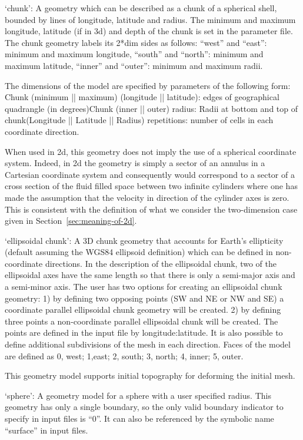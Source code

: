\begin{itemize}
`chunk': A geometry which can be described as a chunk of a spherical shell, bounded by lines of longitude, latitude and radius. The minimum and maximum longitude, latitude (if in 3d) and depth of the chunk is set in the parameter file. The chunk geometry labels its 2*dim sides as follows: ``west'' and ``east'': minimum and maximum longitude, ``south'' and ``north'': minimum and maximum latitude, ``inner'' and ``outer'': minimum and maximum radii. 

The dimensions of the model are specified by parameters of the following form: Chunk (minimum || maximum) (longitude || latitude): edges of geographical quadrangle (in degrees)Chunk (inner || outer) radius: Radii at bottom and top of chunk(Longitude || Latitude || Radius) repetitions: number of cells in each coordinate direction.

When used in 2d, this geometry does not imply the use of a spherical coordinate system. Indeed, in 2d the geometry is simply a sector of an annulus in a Cartesian coordinate system and consequently would correspond to a sector of a cross section of the fluid filled space between two infinite cylinders where one has made the assumption that the velocity in direction of the cylinder axes is zero. This is consistent with the definition of what we consider the two-dimension case given in Section~\ref{sec:meaning-of-2d}.

`ellipsoidal chunk': A 3D chunk geometry that accounts for Earth's ellipticity (default assuming the WGS84 ellipsoid definition) which can be defined in non-coordinate directions. In the description of the ellipsoidal chunk, two of the ellipsoidal axes have the same length so that there is only a semi-major axis and a semi-minor axis. The user has two options for creating an ellipsoidal chunk geometry: 1) by defining two opposing points (SW and NE or NW and SE) a coordinate parallel ellipsoidal chunk geometry will be created. 2) by defining three points a non-coordinate parallel ellipsoidal chunk will be created. The points are defined in the input file by longitude:latitude. It is also possible to define additional subdivisions of the mesh in each direction. Faces of the model are defined as 0, west; 1,east; 2, south; 3, north; 4, inner; 5, outer.

This geometry model supports initial topography for deforming the initial mesh.

`sphere': A geometry model for a sphere with a user specified radius. This geometry has only a single boundary, so the only valid boundary indicator to specify in input files is ``0''. It can also be referenced by the symbolic name ``surface'' in input files.


\end{itemize}
